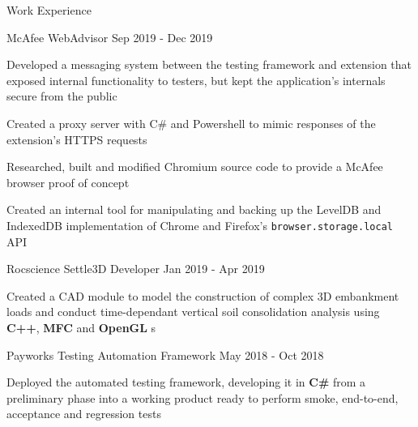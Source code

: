 \documentclass{resume} %
\begin{document}
\begin{rSection}{Work Experience}
    \begin{workexperience}
        {McAfee}
        {WebAdvisor}
        {Sep 2019 - Dec 2019}
        {
            \item Developed a messaging system between the testing framework and extension that exposed internal functionality to testers, but kept the application's internals secure from the public
            \item Created a proxy server with C\# and Powershell to mimic responses of the extension's HTTPS requests  
            \item Researched, built and modified Chromium source code to provide a McAfee browser proof of concept 
            \item Created an internal tool for manipulating and backing up the LevelDB and IndexedDB implementation of Chrome and Firefox's \texttt{browser.storage.local} API
        }
    \end{workexperience}

    \begin{workexperience}
        {Rocscience}
        {Settle3D Developer}
        {Jan 2019 - Apr 2019}
        {
            \item Created a CAD module to model the construction of complex 3D embankment loads and 
            conduct time-dependant vertical soil consolidation analysis using \textbf{C++}, \textbf{MFC} and \textbf{OpenGL}
s        }
    \end{workexperience}
    
    \begin{workexperience}
        {Payworks}
        {Testing Automation Framework}
        {May 2018 - Oct 2018}
        {
            \item Deployed the automated testing framework, developing it in \textbf{C\#} from a preliminary phase into a working product ready to perform smoke, end-to-end, acceptance and regression tests
        }
    \end{workexperience}

    \vspace{1em}

\end{rSection}



\end{document}
